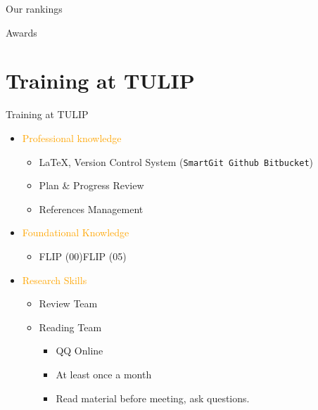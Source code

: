 \documentclass[
 size=14pt,
 paper=smartboard,  %
 mode=present, 		%
 display=slides, 	%
 style=tuliplab,  	%
 pauseslide,
 fleqn,leqno]{powerdot}
\begin{document}
\begin{slide}[toc=,bm=]{Our rankings}


\end{slide}

\begin{slide}[toc=,bm=]{Awards}


\end{slide}


\section{Training at TULIP}


\begin{slide}{Training at TULIP}
\begin{itemize}
  \item \textcolor{orange}{Professional knowledge}
    \begin{itemize}
          \item \LaTeX{},
                Version Control System (\texttt{SmartGit Github Bitbucket})
          \item Plan \& Progress Review
          \item References Management
        \end{itemize}
  \item \textcolor{orange}{Foundational Knowledge}
    \begin{itemize}
      \item FLIP (00)\texttildelow FLIP (05)
    \end{itemize}
  \item \textcolor{orange}{Research Skills}
    \begin{itemize}
      \item Review Team
      \item Reading Team
        \begin{itemize}
          \item QQ Online
          \item At least once a month
          \item Read material before meeting,
                ask questions.
        \end{itemize}
    \end{itemize}
\end{itemize}

\end{slide}
\end{document}
